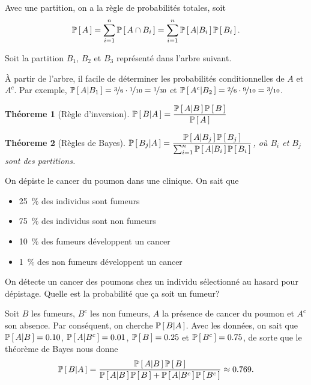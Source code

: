 \documentclass[11pt]{article}
\renewcommand\P[1]{%
	\ensuremath{%
		\mathbb{P}\left[\,#1\,\right]%
	}%
}%
\newcommand\Pg[2]{%
	\ensuremath{%
		\mathbb{P}\left[\,#1\middle\rvert#2\,\right]%
	}%
}%
\newtheorem{theoreme}{Théoreme}[section]
\begin{document}
Avec une partition, on a la règle de probabilités totales, soit
\begin{equation*}
	\P{A}=\sum_{i=1}^n\P{A\cap B_i}=\sum_{i=1}^n\Pg{A}{B_i}\P{B_i}.
\end{equation*}

\begin{exemple}
	Soit la partition $B_1$, $B_2$ et $B_3$ représenté dans l'arbre suivant.
	\begin{figure}[H]
		\centering
		
	\end{figure}

	À partir de l'arbre, il facile de déterminer les probabilités
	conditionnelles de $A$ et $A^c$. Par exemple,
	$\Pg{A}{B_1}=\nicefrac{3}{6}\cdot\nicefrac{1}{10}=\nicefrac{1}{30}$ et
	$\Pg{A^c}{B_2}=\nicefrac{2}{6}\cdot\nicefrac{9}{10}=\nicefrac{3}{10}$.
\end{exemple}

\begin{theoreme}[Règle d'inversion]
	$\Pg{B}{A}=\dfrac{\Pg{A}{B}\P{B}}{\P{A}}$
\end{theoreme}

\begin{theoreme}[Règles de Bayes]
	$\Pg{B_j}{A}=\dfrac{\Pg{A}{B_j}\P{B_j}}{\sum_{i=1}^n\Pg{A}{B_i}\P{B_i}}$, où $B_i$ et
	$B_j$ sont des partitions.
\end{theoreme}

\begin{exemple}
	On dépiste le cancer du poumon dans une clinique. On sait que 
	\begin{itemize}
		\item\SI{25}{\percent} des individus sont fumeurs
		\item\SI{75}{\percent} des individus sont non fumeurs
		\item\SI{10}{\percent} des fumeurs développent un cancer
		\item\SI{1 }{\percent} des non fumeurs développent un cancer
	\end{itemize}

	On détecte un cancer des poumons chez un individu sélectionné au hasard
	pour dépistage. Quelle est la probabilité que ça soit un fumeur?

	Soit $B$ les fumeurs, $B^c$ les non fumeurs, $A$ la présence de cancer du
	poumon et $A^c$ son absence. Par conséquent, on cherche $\Pg{B}{A}$. Avec les
	données, on sait que $\Pg{A}{B}=\SI{0.10}{}$, $\Pg{A}{B^c}=\SI{0.01}{}$,
	$\P{B}=\SI{0.25}{}$ et $\P{B^c}=\SI{0.75}{}$, de sorte que le théorème de
	Bayes nous donne
	\begin{equation*}
		\Pg{B}{A}
		=\frac{\Pg{A}{B}\P{B}}{\Pg{A}{B}\P{B}+\Pg{A}{B^c}\P{B^c}}
		\approx\SI{0.769}{}.
	\end{equation*}
\end{exemple}
\end{document}
